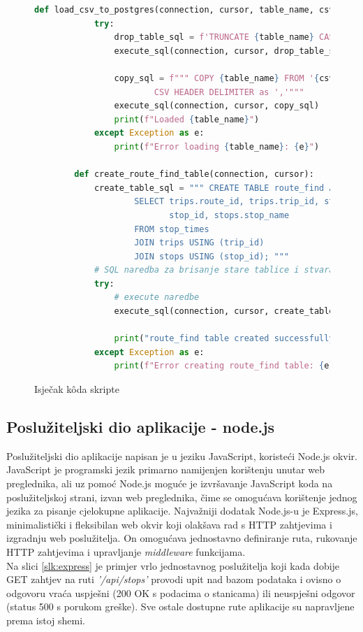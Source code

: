 \documentclass[zavrsnirad]{fer}
\begin{document}
\begin{figure}[H]
	\centering
	\begin{minipage}{0.9\linewidth}
		\begin{lstlisting}[language=Python]
		def load_csv_to_postgres(connection, cursor, table_name, csv_file_path):
			try:
				drop_table_sql = f'TRUNCATE {table_name} CASCADE;'
				execute_sql(connection, cursor, drop_table_sql)

				copy_sql = f""" COPY {table_name} FROM '{csv_file_path}' WITH
						CSV HEADER DELIMITER as ','"""
				execute_sql(connection, cursor, copy_sql)
				print(f"Loaded {table_name}")
			except Exception as e:
				print(f"Error loading {table_name}: {e}")

		def create_route_find_table(connection, cursor):
			create_table_sql = """ CREATE TABLE route_find AS
					SELECT trips.route_id, trips.trip_id, stop_times.stop_sequence,
						   stop_id, stops.stop_name
					FROM stop_times
					JOIN trips USING (trip_id)
					JOIN stops USING (stop_id); """
			# SQL naredba za brisanje stare tablice i stvaranje indeksa
			try:
				# execute naredbe
				execute_sql(connection, cursor, create_table_sql)

				print("route_find table created successfully.")
			except Exception as e:
				print(f"Error creating route_find table: {e}")
		\end{lstlisting}
	\end{minipage}
	\caption{Isječak k\^oda skripte}
	\label{slk:pytonskripta}
\end{figure}
\newpage
\subsection{Poslužiteljski dio aplikacije - node.js}
Poslužiteljski dio aplikacije napisan je u jeziku JavaScript, koristeći Node.js okvir. JavaScript je programski jezik primarno namijenjen korištenju unutar web preglednika, ali uz pomoć Node.js moguće je izvršavanje JavaScript koda na poslužiteljskoj strani, izvan web preglednika, čime se omogućava korištenje jednog jezika za pisanje cjelokupne aplikacije. Najvažniji dodatak Node.js-u je Express.js, minimalistički i fleksibilan web okvir koji olakšava rad s HTTP zahtjevima i izgradnju web poslužitelja. On omogućava jednostavno definiranje ruta, rukovanje HTTP zahtjevima i upravljanje \textit{middleware} funkcijama.\\
Na slici \ref{slk:express} je primjer vrlo jednostavnog poslužitelja koji kada dobije GET zahtjev na ruti \textit{'/api/stops'} provodi upit nad bazom podataka i ovisno o odgovoru vraća uspješni (200 OK s podacima o stanicama) ili neuspješni odgovor (status 500 s porukom greške). Sve ostale dostupne rute aplikacije su napravljene prema istoj shemi.
\end{document}

